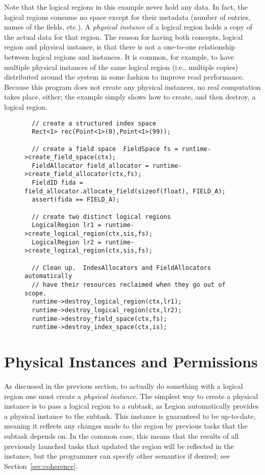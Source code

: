 Note that the logical regions in this example never hold any data.  In
fact, the logical regions consume no space except for their metadata
(number of entries, names of the fields, etc.).  A {\em physical
  instance} of a logical region holds a copy of the actual data for
that region.  The reason for having both concepts, logical region and
physical instance, is that there is not a one-to-one relationship
between logical regions and instances.  It is common, for example, to
have multiple physical instances of the same logical region (i.e.,
multiple copies) distributed around the system in some fashion to
improve read performance.  Because this program does not create any
physical instances, no real computation takes place, either; the
example simply shows how to create, and then destroy, a logical
region.

\begin{figure}
{\small
\begin{lstlisting}
  // create a structured index space
  Rect<1> rec(Point<1>(0),Point<1>(99));

  // create a field space  FieldSpace fs = runtime->create_field_space(ctx);
  FieldAllocator field_allocator = runtime->create_field_allocator(ctx,fs);
  FieldID fida = field_allocator.allocate_field(sizeof(float), FIELD_A);
  assert(fida == FIELD_A);

  // create two distinct logical regions   
  LogicalRegion lr1 = runtime->create_logical_region(ctx,sis,fs);
  LogicalRegion lr2 = runtime->create_logical_region(ctx,sis,fs);

  // Clean up.  IndexAllocators and FieldAllocators automatically
  // have their resources reclaimed when they go out of scope.
  runtime->destroy_logical_region(ctx,lr1);
  runtime->destroy_logical_region(ctx,lr2);
  runtime->destroy_field_space(ctx,fs);
  runtime->destroy_index_space(ctx,is);
\end{lstlisting}
}
\caption{}
\label{fig:lr1}
\end{figure}

\section{Physical Instances and Permissions}
\label{sec:permissions}

As discussed in the previous section, to actually do something with a logical region one must create
a {\em physical instance}.  The simplest way to create a physical instance is to pass a logical region to a
subtask, as Legion automatically provides a physical instance to the subtask.  This instance is guaranteed to be
up-to-date, meaning it reflects any changes made to the region by previous tasks that the subtask depends on.
In the common case, this means that the results of all previously launched tasks that updated the region will be
reflected in the instance, but the programmer can specify other semantics if desired; see Section~\ref{sec:coherence}.

